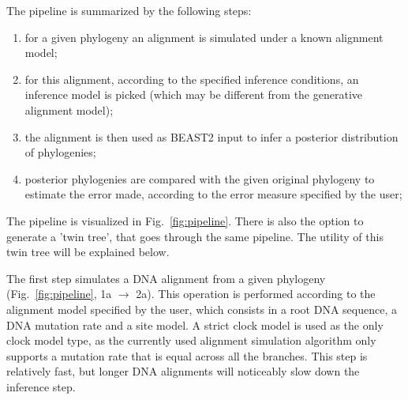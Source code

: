 \documentclass{article}
\begin{document}
The pipeline is summarized by the following steps:
\begin{enumerate}
    \item for a given phylogeny an alignment is simulated under a known alignment model;
    \item for this alignment, according to the specified inference conditions, an inference model is picked (which may be different from the generative alignment model);
    \item the alignment is then used as BEAST2 input to infer a posterior distribution of phylogenies;
    \item posterior phylogenies are compared with the given original phylogeny to estimate the error made, according to the error measure specified by the user;
\end{enumerate}
The pipeline is visualized in Fig.~\ref{fig:pipeline}. 
There is also the option to generate a 'twin tree', 
that goes through the same pipeline. 
The utility of this twin tree will be explained below.

The first step simulates a DNA alignment from a given 
phylogeny (Fig.~\ref{fig:pipeline}, 1a $\rightarrow$ 2a).
This operation is performed according to the alignment model 
specified by the user, which consists in a root DNA sequence, 
a DNA mutation rate and a site model.
A strict clock model is used as the only clock model
type, as the currently used alignment simulation algorithm
only supports a mutation rate that is equal across all the branches.
This step is relatively fast, 
but longer DNA alignments will noticeably slow down the inference step.
\end{document}
